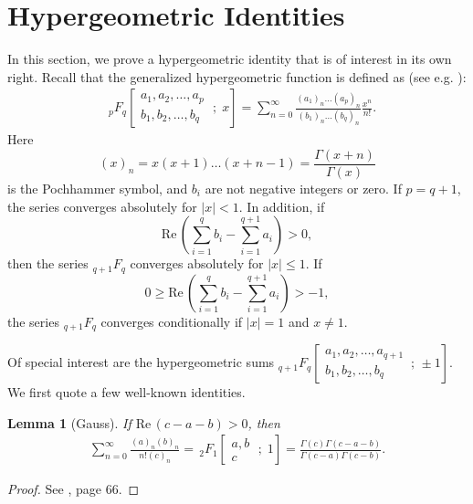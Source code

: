 \documentclass[reqno]{amsart}
\newtheorem{lemma}[theorem]{Lemma}
\theoremstyle{definition}
\theoremstyle{remark}
\numberwithin{equation}{section}
\begin{document}
\section{Hypergeometric Identities }
In this section, we prove a hypergeometric identity that is of interest in its own right. Recall that the generalized hypergeometric function is defined as (see e.g. \cite{4}):
\begin{align*}
&_{p}F_{q}\left[\begin{aligned} a_1, a_2,   \ldots, a_p\\b_1, b_2, \ldots, b_q\end{aligned}\;;\;x\right]=\sum_{n=0}^{\infty}
\frac{(a_1)_n\ldots (a_p)_n}{(b_1)_n\ldots (b_q)_n}\frac{x^n}{n!}.
\end{align*}Here $$(x)_n=x(x+1)\ldots(x+n-1)=\frac{\Gamma(x+n)}{\Gamma(x)}$$
is the Pochhammer symbol, and $b_i$ are not negative integers or zero. If $p=q+1$, the series converges absolutely for $|x|<1$. In addition, if
$$\text{Re}\,\left(\sum_{i=1}^q b_i-\sum_{i=1}^{q+1}a_i\right)>0,$$
then the series $_{q+1}F_q$ converges absolutely for $|x|\leq 1$. If
$$0\geq \text{Re}\,\left(\sum_{i=1}^q b_i-\sum_{i=1}^{q+1}a_i\right)>-1,$$
the series $_{q+1}F_q$ converges conditionally if $|x|= 1$ and $x\neq 1$.

Of special interest are the hypergeometric sums
$\displaystyle
_{q+1}F_{q}\left[\begin{aligned} a_1, a_2,   \ldots, a_{q+1}\\b_1, b_2, \ldots, b_q\quad\end{aligned}\,;\,\pm 1\right]$. We first quote a few well-known identities.
\begin{lemma}[Gauss]\label{lemma7}
If $\text{Re}\,(c-a-b)>0$, then
\begin{align*}
\sum_{n=0}^{\infty}\frac{(a)_n(b)_n}{n! (c)_n}=\,_2F_1\left[\begin{aligned} a, b\\ c\;\;\end{aligned}\;;\;1\right]=\frac{\Gamma(c)\Gamma(c-a-b)}{\Gamma(c-a)\Gamma(c-b)}.
\end{align*}
\end{lemma}
\begin{proof}
See \cite{4}, page 66.
\end{proof}
\end{document}
